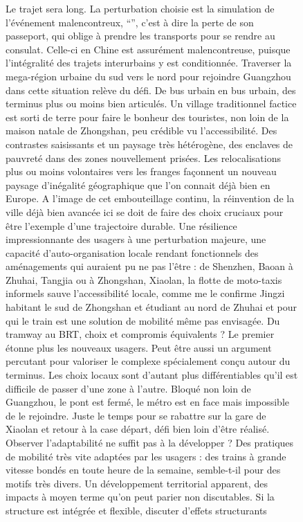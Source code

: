 \begin{figure}[h!]
\begin{mdframed}
\medskip


\end{mdframed}
\end{figure}




\begin{figure}[h!]
\begin{mdframed}
Le trajet sera long. La perturbation choisie est la simulation de l'événement malencontreux, ``'', c'est à dire la perte de son passeport, qui oblige à prendre les transports pour se rendre au consulat. Celle-ci en Chine est assurément malencontreuse, puisque l'intégralité des trajets interurbains y est conditionnée. Traverser la mega-région urbaine du sud vers le nord pour rejoindre Guangzhou dans cette situation relève du défi. De bus urbain en bus urbain, des terminus plus ou moins bien articulés. Un village traditionnel factice est sorti de terre pour faire le bonheur des touristes, non loin de la maison natale de Zhongshan, peu crédible vu l'accessibilité. Des contrastes saisissants et un paysage très hétérogène, des enclaves de pauvreté dans des zones nouvellement prisées. Les relocalisations plus ou moins volontaires vers les franges façonnent un nouveau paysage d'inégalité géographique que l'on connait déjà bien en Europe. A l'image de cet embouteillage continu, la réinvention de la ville déjà bien avancée ici se doit de faire des choix cruciaux pour être l'exemple d'une trajectoire durable. Une résilience impressionnante des usagers à une perturbation majeure, une capacité d'auto-organisation locale rendant fonctionnels des aménagements qui auraient pu ne pas l'être : de Shenzhen, Baoan à Zhuhai, Tangjia ou à Zhongshan, Xiaolan, la flotte de moto-taxis informels sauve l'accessibilité locale, comme me le confirme Jingzi habitant le sud de Zhongshan et étudiant au nord de Zhuhai et pour qui le train est une solution de mobilité même pas envisagée. Du tramway au BRT, choix et compromis équivalents ? Le premier étonne plus les nouveaux usagers. Peut être aussi un argument percutant pour valoriser le complexe spécialement conçu autour du terminus. Les choix locaux sont d'autant plus différentiables qu'il est difficile de passer d'une zone à l'autre. Bloqué non loin de Guangzhou, le pont est fermé, le métro est en face mais impossible de le rejoindre. Juste le temps pour se rabattre sur la gare de Xiaolan et retour à la case départ, défi bien loin d'être réalisé. Observer l'adaptabilité ne suffit pas à la développer ? Des pratiques de mobilité très vite adaptées par les usagers : des trains à grande vitesse bondés en toute heure de la semaine, semble-t-il pour des motifs très divers. Un développement territorial apparent, des impacts à moyen terme qu'on peut parier non discutables. Si la structure est intégrée et flexible, discuter d'effets structurants 
\end{mdframed}
\end{figure}
